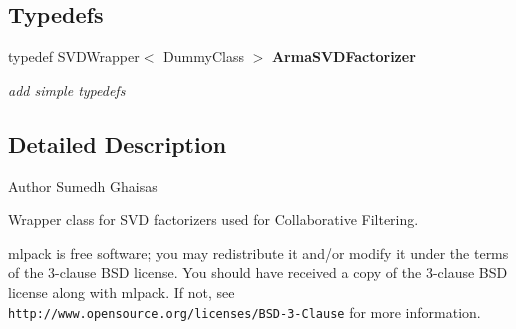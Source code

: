 \subsection*{Typedefs}
\begin{DoxyCompactItemize}
\item 
typedef S\+V\+D\+Wrapper$<$ Dummy\+Class $>$ \textbf{ Arma\+S\+V\+D\+Factorizer}
\begin{DoxyCompactList}\small\item\em add simple typedefs \end{DoxyCompactList}\end{DoxyCompactItemize}


\subsection{Detailed Description}
\begin{DoxyAuthor}{Author}
Sumedh Ghaisas
\end{DoxyAuthor}
Wrapper class for S\+VD factorizers used for Collaborative Filtering.

mlpack is free software; you may redistribute it and/or modify it under the terms of the 3-\/clause B\+SD license. You should have received a copy of the 3-\/clause B\+SD license along with mlpack. If not, see {\tt http\+://www.\+opensource.\+org/licenses/\+B\+S\+D-\/3-\/\+Clause} for more information. 